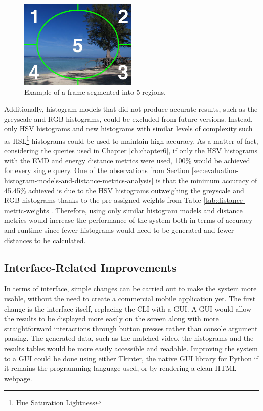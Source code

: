 \begin{figure}[h] 
\centerline{\includegraphics[width=0.5\textwidth]{figures/conclusions/image_regions.jpg}}
\caption{\label{fig:conclusions-image_regions}Example of a frame segmented into 5 regions.}
\end{figure}

Additionally, histogram models that did not produce accurate results, such as the greyscale and RGB histograms, could be excluded from future versions. Instead, only HSV histograms and new histograms with similar levels of complexity such as HSL\footnote{Hue Saturation Lightness} histograms could be used to maintain high accuracy. As a matter of fact, considering the queries used in Chapter \ref{ch:chapter6}, if only the HSV histograms with the EMD and energy distance metrics were used, 100\% would be achieved for every single query. One of the observations from Section \ref{sec:evaluation-histogram-models-and-distance-metrics-analysis} is that the minimum accuracy of 45.45\% achieved is due to the HSV histograms outweighing the greyscale and RGB histograms thanks to the pre-assigned weights from Table \ref{tab:distance-metric-weights}. Therefore, using only similar histogram models and distance metrics would increase the performance of the system both in terms of accuracy and runtime since fewer histograms would need to be generated and fewer distances to be calculated.

\subsection{Interface-Related Improvements}

In terms of interface, simple changes can be carried out to make the system more usable, without the need to create a commercial mobile application yet. The first change is the interface itself, replacing the CLI with a GUI. A GUI would allow the results to be displayed more easily on the screen along with more straightforward interactions through button presses rather than console argument parsing. The generated data, such as the matched video, the histograms and the results tables would be more easily accessible and readable. Improving the system to a GUI could be done using either Tkinter, the native GUI library for Python if it remains the programming language used, or by rendering a clean HTML webpage.\\

